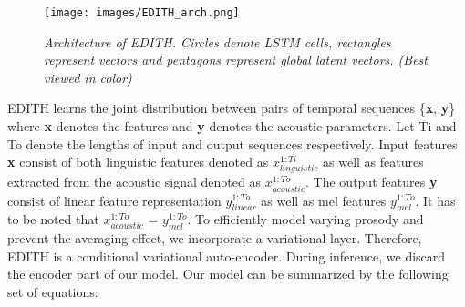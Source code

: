 \begin{figure}[t]
\centering
\texttt{[image: images/EDITH\_arch.png]}
\caption{\textit{Architecture of EDITH. Circles denote LSTM cells, rectangles represent vectors and pentagons represent global latent vectors. (Best viewed in color)}} 
\label{edith_architecture}
\end{figure}  

EDITH learns the joint distribution between pairs of temporal sequences \{\textbf{x}, \textbf{y}\} where \textbf{x} denotes the features and \textbf{y} denotes the acoustic parameters. Let Ti and To denote the lengths of input and output sequences respectively. Input features \textbf{x} consist of both linguistic features denoted as \textbf{$x_{linguistic}^{1:Ti}$} as well as features extracted from the acoustic signal denoted as \textbf{$x_{acoustic}^{1:To}$}. The output features \textbf{y} consist of linear feature representation \textbf{$y_{linear}^{1:To}$} as well as mel features \textbf{$y_{mel}^{1:To}$}. It has to be noted that \textbf{$x_{acoustic}^{1:To}$} = \textbf{$y_{mel}^{1:To}$}. To efficiently model varying prosody and prevent the averaging effect, we incorporate a variational layer. Therefore, EDITH is a conditional variational auto-encoder. During inference, we discard the encoder part of our model. Our model can be summarized by the following set of equations: 




